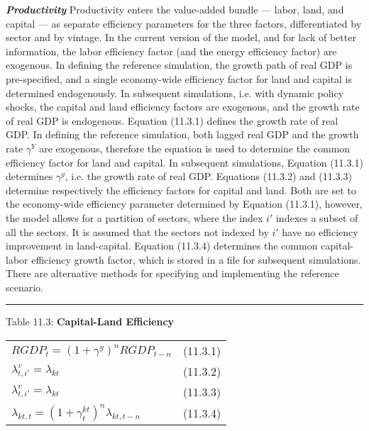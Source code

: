 \documentclass{article}
\begin{document}
\textbf{\textit{Productivity}}
Productivity enters the value-added bundle — labor, land, and capital — as separate efficiency parameters for the three factors, differentiated by sector and by vintage. In the current version of the model, and for lack of better information, the labor efficiency factor (and the energy efficiency factor) are exogenous. In defining the reference simulation, the growth path of real GDP is pre-specified, and a single economy-wide efficiency factor for land and capital is determined endogenously. In subsequent simulations, i.e. with dynamic policy shocks, the capital and land efficiency factors are exogenous, and the growth rate of real GDP is endogenous. 
Equation (11.3.1) defines the growth rate of real GDP. In defining the reference simulation, both lagged real GDP and the growth rate $\gamma^Y$ are exogenous, therefore the equation is used to determine the common efficiency factor for land and capital. In subsequent simulations, Equation (11.3.1) determines $\gamma^y$, i.e. the growth rate of real GDP. Equations (11.3.2) and (11.3.3) determine respectively the efficiency factors for capital and land. Both are set to the economy-wide efficiency parameter determined by Equation (11.3.1), however, the model allows for a partition of sectors, where the index $i'$ indexes a subset of all the sectors. It is assumed that the sectors not indexed by $i'$ have no efficiency improvement in land-capital. Equation (11.3.4) determines the common capital-labor efficiency growth factor, which is stored in a file for subsequent simulations. There are alternative methods for specifying and implementing the reference scenario.

\newpage
\noindent\rule{\linewidth}{0.4pt}
\begin{center}
\begin{large}
{\centering Table 11.3: \textbf{Capital-Land Efficiency} \par}

\begin{tabular}{>{\raggedright}p{} l}


$RGDP_t = (1 + \gamma^y)^n RGDP_{t-n}$ & (11.3.1) \\[15pt]

$\lambda^v_{t,i'} = \lambda_{kt}$ & (11.3.2) \\[15pt]

$\lambda^v_{t,i'} = \lambda_{kt}$ & (11.3.3) \\[15pt]

$\lambda_{kt,t} = (1 + \gamma^{kt}_t)^n \lambda_{kt, t-n}$ & (11.3.4)\\[20pt]

\hline
\end{tabular}
\end{large}
\end{center}
\end{document}
